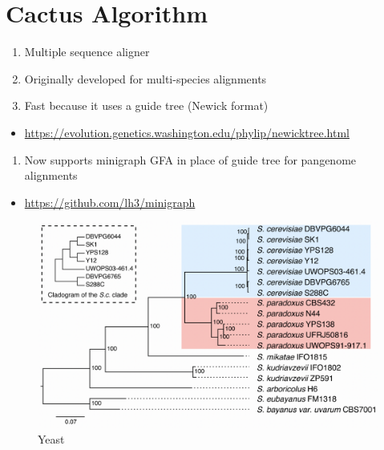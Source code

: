 \documentclass[
]{book}
\providecommand{\tightlist}{%
  \setlength{\itemsep}{0pt}\setlength{\parskip}{0pt}}
\begin{document}
\hypertarget{cactus-algorithm}{%
\section{Cactus Algorithm}\label{cactus-algorithm}}

\begin{enumerate}
\def\labelenumi{\arabic{enumi}.}
\tightlist
\item
  Multiple sequence aligner
\item
  Originally developed for multi-species alignments
\item
  Fast because it uses a guide tree (Newick format)
\end{enumerate}

\begin{itemize}
\tightlist
\item
  \url{https://evolution.genetics.washington.edu/phylip/newicktree.html}
\end{itemize}

\begin{enumerate}
\def\labelenumi{\arabic{enumi}.}
\setcounter{enumi}{3}
\tightlist
\item
  Now supports minigraph GFA in place of guide tree for pangenome
  alignments
\end{enumerate}

\begin{itemize}
\tightlist
\item
  \url{https://github.com/lh3/minigraph}
\end{itemize}

\begin{figure}
\centering
\includegraphics[width=1\textwidth,height=\textheight]{./Figures/Yeast.png}
\caption{Yeast}
\end{figure}
\end{document}
